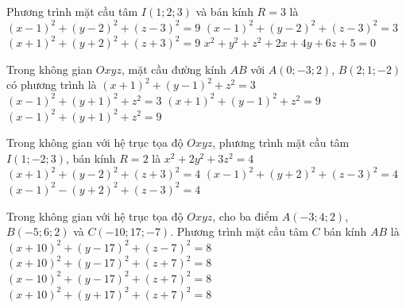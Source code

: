 \begin{ex}%
	 Phương trình mặt cầu tâm $I\left(1;2;3\right)$ và bán kính $R=3$ là
	 \choice
		{\True  $\left(x-1\right)^2+\left(y-2\right)^2+\left(z-3\right)^2=9$}
		{$\left(x-1\right)^2+\left(y-2\right)^2+\left(z-3\right)^2=3$} 
		{$\left(x+1\right)^2+\left(y+2\right)^2+\left(z+3\right)^2=9$} 
		 {$x^2+y^2+z^2+2x+4y+6z+5=0$}
\end{ex}

\begin{ex}%
	Trong không gian $Oxyz$, mặt cầu đường kính $AB$ với $A\left(0;-3;2\right)$, $B\left(2;1;-2\right)$ có phương  trình là
	\choice 
		 {$\left(x+1\right)^2+\left(y-1\right)^2+z^2=3$}
		{$\left(x-1\right)^2+\left(y+1\right)^2+z^2=3$} 
		 {$\left(x+1\right)^2+\left(y-1\right)^2+z^2=9$}
		{\True  $\left(x-1\right)^2+\left(y+1\right)^2+z^2=9$}
\end{ex}

\begin{ex}%
	Trong không  gian với hệ trục tọa độ $Oxyz$, phương trình mặt cầu tâm $I\left(1;-2;3\right)$, bán kính $R=2$ là
	 \choice
		{$x^2+2y^2+3z^2=4$} 
		{$\left(x+1\right)^2+\left(y-2\right)^2+\left(z+3\right)^2=4$} 
		{\True  $\left(x-1\right)^2+\left(y+2\right)^2+\left(z-3\right)^2=4$}
		{$\left(x-1\right)^2-\left(y+2\right)^2+\left(z-3\right)^2=4$} 
\end{ex}

\begin{ex}%
	Trong không gian với hệ trục tọa độ $Oxyz$,  cho ba điểm $A\left(-3;4;2\right)$, $B\left(-5;6;2\right)$ và $C\left(-10;17;-7\right)$. Phương trình mặt cầu tâm $C$ bán kính $AB$ là
	 \choice
		 {$\left(x+10\right)^2+\left(y-17\right)^2+\left(z-7\right)^2=8$}
		 {\True $\left(x+10\right)^2+\left(y-17\right)^2+\left(z+7\right)^2=8$}
		{$\left(x-10\right)^2+\left(y-17\right)^2+\left(z+7\right)^2=8$} 
		{$\left(x+10\right)^2+\left(y+17\right)^2+\left(z+7\right)^2=8$} 
\end{ex}

